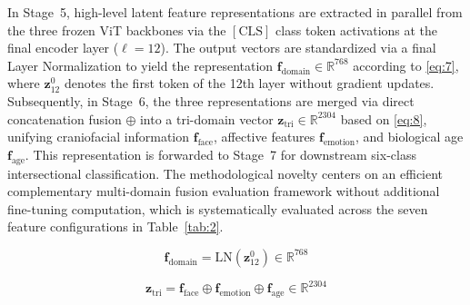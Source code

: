 In Stage~5, high-level latent feature representations are extracted in parallel from the three frozen ViT backbones via the $[\text{CLS}]$ class token activations at the final encoder layer ($\ell = 12$). The output vectors are standardized via a final Layer Normalization to yield the representation $\mathbf{f}_{\text{domain}} \in \mathbb{R}^{768}$ according to \eqref{eq:7}, where $\mathbf{z}_{12}^0$ denotes the first token of the 12th layer without gradient updates. Subsequently, in Stage~6, the three representations are merged via direct concatenation fusion $\oplus$ into a tri-domain vector $\mathbf{z}_{\text{tri}} \in \mathbb{R}^{2304}$ based on \eqref{eq:8}, unifying craniofacial information $\mathbf{f}_{\text{face}}$, affective features $\mathbf{f}_{\text{emotion}}$, and biological age $\mathbf{f}_{\text{age}}$. This representation is forwarded to Stage~7 for downstream six-class intersectional classification. The methodological novelty centers on an efficient complementary multi-domain fusion evaluation framework without additional fine-tuning computation, which is systematically evaluated across the seven feature configurations in Table~\ref{tab:2}.

\begin{equation}
\mathbf{f}_{\text{domain}} = \text{LN}(\mathbf{z}_{12}^0) \in \mathbb{R}^{768}
\label{eq:7}
\end{equation}

\begin{equation}
\mathbf{z}_{\text{tri}} = \mathbf{f}_{\text{face}} \oplus \mathbf{f}_{\text{emotion}} \oplus \mathbf{f}_{\text{age}} \in \mathbb{R}^{2304}
\label{eq:8}
\end{equation}
